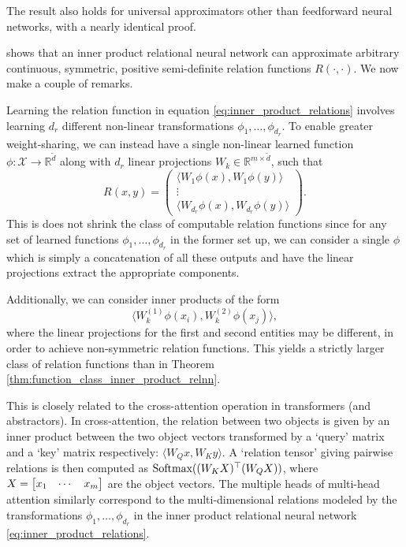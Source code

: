 \begin{remark}
	The result also holds for universal approximators other than feedforward neural networks, with a nearly identical proof.
\end{remark}

 shows that an inner product relational neural network can approximate arbitrary continuous, symmetric, positive semi-definite relation functions \(R(\cdot, \cdot)\). We now make a couple of remarks.

Learning the relation function in equation \eqref{eq:inner_product_relations} involves learning \(d_r\) different non-linear transformations \(\phi_{1}, \ldots, \phi_{d_r}\). To enable greater weight-sharing, we can instead have a single non-linear learned function \(\phi: \mathcal{X} \to \mathbb{R}^{\tilde{d}}\) along with \(d_r\) linear projections \(W_k \in \mathbb{R}^{m \times \tilde{d}}\), such that
\begin{equation}
	\label{eq:weight_sharing_inner_product_relnn}
	R(x,y) = \begin{pmatrix}\langle W_1 \phi(x), W_1 \phi(y) \rangle \\ \vdots \\ \langle W_{d_r}\phi(x), W_{d_r}\phi(y) \rangle\end{pmatrix}.
\end{equation}
This is does not shrink the class of computable relation functions since for any set of learned functions \(\phi_1, \ldots, \phi_{d_r}\) in the former set up, we can consider a single \(\phi\) which is simply a concatenation of all these outputs and have the linear projections extract the appropriate components.

Additionally, we can consider inner products of the form
\begin{equation}
	\label{eq:nonsymmetric_inner_product_relnn}
	\langle W_k^{(1)} \phi(x_i), W_k^{(2)} \phi(x_j) \rangle,
\end{equation}
\noindent where the linear projections for the first and second entities may be different, in order to achieve non-symmetric relation functions. This yields a strictly larger class of relation functions than in Theorem \ref{thm:function_class_inner_product_relnn}.

This is closely related to the cross-attention operation in transformers (and  abstractors). In cross-attention, the relation between two objects is given by an inner product between the two object vectors transformed by a `query' matrix and a `key' matrix respectively: \(\langle W_Q x, W_K y \rangle\). A `relation tensor' giving pairwise relations is then computed as \(\text{Softmax}((W_K X)^\top (W_Q X))\), where \(X = \begin{bmatrix} x_1 & \cdots & x_\m\end{bmatrix}\) are the object vectors. The multiple heads of multi-head attention similarly correspond to the multi-dimensional relations modeled by the transformations \(\phi_{1}, \ldots, \phi_{d_r}\) in the inner product relational neural network \ref{eq:inner_product_relations}.

